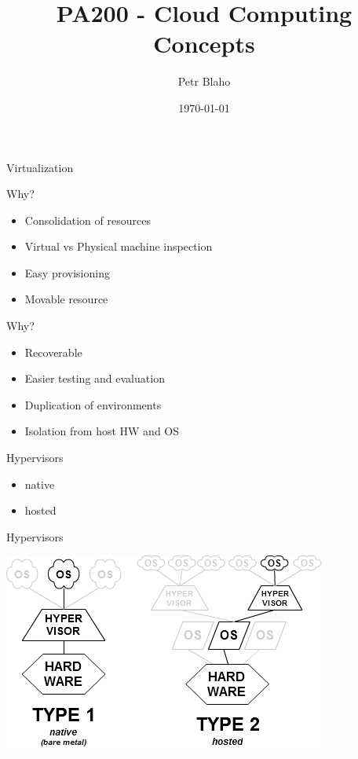 \documentclass[presentation]{beamer}
\author{Petr Blaho}
\date{\today}
\title{PA200 - Cloud Computing Concepts}
\begin{document}
\maketitle


\begin{frame}[label={sec:org3e99d5e}]{Virtualization}
\begin{block}{Why?}
\begin{itemize}
\item Consolidation of resources
\item Virtual vs Physical machine inspection
\item Easy provisioning
\item Movable resource
\end{itemize}
\end{block}

\begin{block}{Why?}
\begin{itemize}
\item Recoverable
\item Easier testing and evaluation
\item Duplication of environments
\item Isolation from host HW and OS
\end{itemize}
\end{block}
\end{frame}

\begin{frame}[label={sec:orgb18dce3}]{Hypervisors}
\begin{itemize}
\item native
\item hosted
\end{itemize}
\begin{block}{Hypervisors}
\begin{center}
\includegraphics[width=.9\linewidth]{./hyperviseur.png}
\end{center}
\end{block}
\end{frame}
\end{document}
